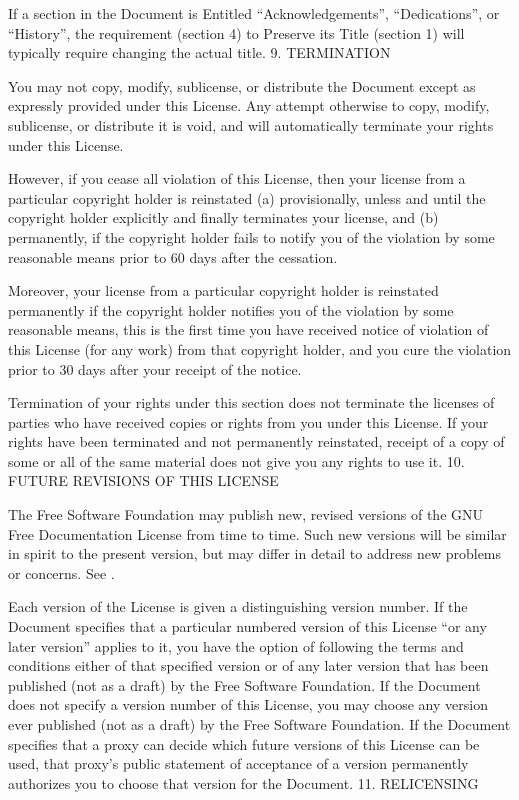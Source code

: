 \documentclass[letterpaper,10pt,english]{sphinxmanual}
\begin{document}
\sphinxAtStartPar
If a section in the Document is Entitled “Acknowledgements”, “Dedications”, or “History”, the requirement (section 4) to Preserve its Title (section 1) will typically require changing the actual title.
9. TERMINATION

\sphinxAtStartPar
You may not copy, modify, sublicense, or distribute the Document except as expressly provided under this License. Any attempt otherwise to copy, modify, sublicense, or distribute it is void, and will automatically terminate your rights under this License.

\sphinxAtStartPar
However, if you cease all violation of this License, then your license from a particular copyright holder is reinstated (a) provisionally, unless and until the copyright holder explicitly and finally terminates your license, and (b) permanently, if the copyright holder fails to notify you of the violation by some reasonable means prior to 60 days after the cessation.

\sphinxAtStartPar
Moreover, your license from a particular copyright holder is reinstated permanently if the copyright holder notifies you of the violation by some reasonable means, this is the first time you have received notice of violation of this License (for any work) from that copyright holder, and you cure the violation prior to 30 days after your receipt of the notice.

\sphinxAtStartPar
Termination of your rights under this section does not terminate the licenses of parties who have received copies or rights from you under this License. If your rights have been terminated and not permanently reinstated, receipt of a copy of some or all of the same material does not give you any rights to use it.
10. FUTURE REVISIONS OF THIS LICENSE

\sphinxAtStartPar
The Free Software Foundation may publish new, revised versions of the GNU Free Documentation License from time to time. Such new versions will be similar in spirit to the present version, but may differ in detail to address new problems or concerns. See .

\sphinxAtStartPar
Each version of the License is given a distinguishing version number. If the Document specifies that a particular numbered version of this License “or any later version” applies to it, you have the option of following the terms and conditions either of that specified version or of any later version that has been published (not as a draft) by the Free Software Foundation. If the Document does not specify a version number of this License, you may choose any version ever published (not as a draft) by the Free Software Foundation. If the Document specifies that a proxy can decide which future versions of this License can be used, that proxy’s public statement of acceptance of a version permanently authorizes you to choose that version for the Document.
11. RELICENSING
\end{document}
